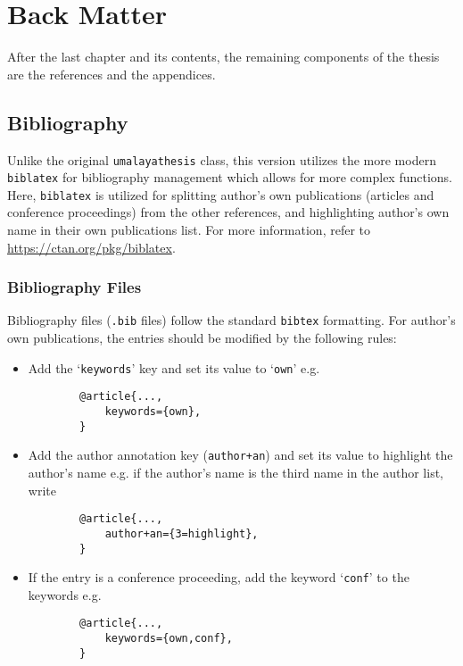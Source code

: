\documentclass{umalayathesis}
\begin{document}
\chapter{Back Matter}

After the last chapter and its contents, the remaining components of the thesis are the references and the appendices. 

\section{Bibliography}\label{sec:ref}

Unlike the original \texttt{umalayathesis} class, this version utilizes the more modern \texttt{biblatex} for bibliography management which allows for more complex functions. Here, \texttt{biblatex} is utilized for splitting author's own publications (articles and conference proceedings) from the other references, and highlighting author's own name in their own publications list. For more information, refer to \url{https://ctan.org/pkg/biblatex}.

\subsection{Bibliography Files}

Bibliography files (\texttt{.bib} files) follow the standard \texttt{bibtex} formatting. For author's own publications, the entries should be modified by the following rules:

\begin{itemize}
    \item Add the `\texttt{keywords}' key and set its value to `\texttt{own}' e.g.
    \begin{verbatim}
        @article{...,
            keywords={own},
        }
    \end{verbatim}
    \item Add the author annotation key (\texttt{author+an}) and set its value to highlight the author's name e.g. if the author's name is the third name in the author list, write 
    \begin{verbatim}
        @article{...,
            author+an={3=highlight},
        }
    \end{verbatim}
    \item If the entry is a conference proceeding, add the keyword `\texttt{conf}' to the keywords e.g.
    \begin{verbatim}
        @article{...,
            keywords={own,conf},
        }
    \end{verbatim}
\end{itemize}
\end{document}
